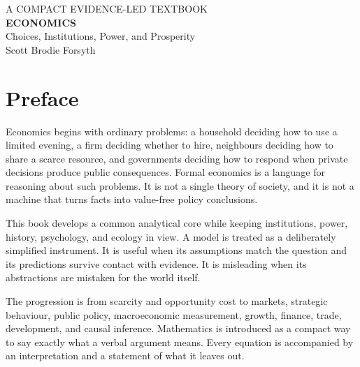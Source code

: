 \documentclass[11pt,oneside,openany]{book}
\begin{document}
\begingroup
{}
\hypersetup{pageanchor=false}
\pagecolor{econnavy}
\thispagestyle{empty}
\color{white}
\vspace*{0.18\paperheight}
\hspace*{0.13\paperwidth}\begin{minipage}{0.74\paperwidth}
  {\sffamily\small\MakeUppercase{A compact evidence-led textbook}}\\[24pt]
  {\sffamily\bfseries\fontsize{40}{44}\selectfont ECONOMICS}\\[12pt]
  {\sffamily\fontsize{18}{23}\selectfont Choices, Institutions, Power, and Prosperity}\\[60pt]
  {\sffamily\large Scott Brodie Forsyth}
\end{minipage}
\vfill
\hspace*{0.13\paperwidth}{\sffamily\small First edition \textbar\ 2026}
\vspace*{0.08\paperheight}
\clearpage
\endgroup
\restoregeometry
\nopagecolor
\hypersetup{pageanchor=true}

\frontmatter
\chapter*{Preface}

Economics begins with ordinary problems: a household deciding how to use a limited evening, a firm deciding whether to hire, neighbours deciding how to share a scarce resource, and governments deciding how to respond when private decisions produce public consequences. Formal economics is a language for reasoning about such problems. It is not a single theory of society, and it is not a machine that turns facts into value-free policy conclusions.

This book develops a common analytical core while keeping institutions, power, history, psychology, and ecology in view. A model is treated as a deliberately simplified instrument. It is useful when its assumptions match the question and its predictions survive contact with evidence. It is misleading when its abstractions are mistaken for the world itself.

The progression is from scarcity and opportunity cost to markets, strategic behaviour, public policy, macroeconomic measurement, growth, finance, trade, development, and causal inference. Mathematics is introduced as a compact way to say exactly what a verbal argument means. Every equation is accompanied by an interpretation and a statement of what it leaves out.
\end{document}

